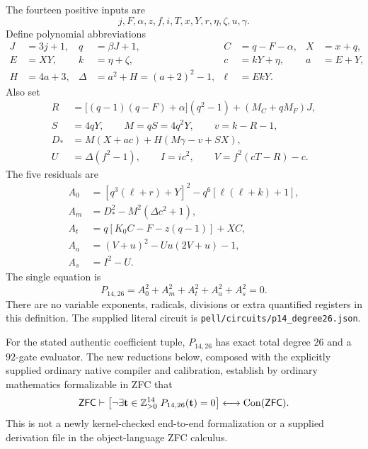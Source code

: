 The fourteen positive inputs are
\[
 j,F,\alpha,z,f,i,T,x,Y,r,\eta,\zeta,u,\gamma.
\]
Define polynomial abbreviations
\begin{align*}
 J&=3j+1,& q&=\beta J+1,& C&=q-F-\alpha,&X&=x+q,\\
 E&=XY,& k&=\eta+\zeta,&c&=kY+\eta,& a&=E+Y,\\
 H&=4a+3,&\Delta&=a^2+H=(a+2)^2-1,&\ell&=EkY.
\end{align*}
Also set
\begin{align*}
 R&=\bigl[(q-1)(q-F)+\alpha\bigr](q^2-1)
                      +(M_C+qM_F)J,\\
 S&=4qY,\qquad M=qS=4q^2Y,\qquad v=k-R-1,\\
 D_*&=M(X+ac)+H(M\gamma-v+SX),\\
 U&=\Delta(f^2-1),\qquad I=ic^2,\qquad V=f^2(cT-R)-c.
\end{align*}
The five residuals are
\begin{align}
 A_0&=[q^3(\ell+r)+Y]^2-q^6[\ell(\ell+k)+1],
                                                    \label{eq:pell-first}\\
 A_m&=D_*^2-M^2(\Delta c^2+1),                       \label{eq:pell-main}\\
 A_t&=q[K_0C-F-z(q-1)]+XC,                          \label{eq:pell-transport}\\
 A_a&=(V+u)^2-Uu(2V+u)-1,                           \label{eq:pell-aux}\\
 A_s&=I^2-U.                                       \label{eq:pell-strong}
\end{align}
The single equation is
\begin{equation}
 \boxed{P_{14,26}=A_0^2+A_m^2+A_t^2+A_a^2+A_s^2=0.}
 \label{eq:pell26}
\end{equation}
There are no variable exponents, radicals, divisions or extra quantified
registers in this definition. The supplied literal circuit is
\texttt{pell/circuits/p14\_degree26.json}.

\begin{theorem}
\label{thm:pell26}
For the stated authentic coefficient tuple, $P_{14,26}$ has exact total
degree $26$ and a $92$-gate evaluator. The new reductions below, composed
with the explicitly supplied ordinary native compiler and calibration,
establish by ordinary mathematics formalizable in ZFC that
\[
 \mathsf{ZFC}\vdash
 \bigl[\neg\exists\mathbf t\in\mathbb Z_{>0}^{14}\;
                   P_{14,26}(\mathbf t)=0\bigr]
       \longleftrightarrow\operatorname{Con}(\mathsf{ZFC}).
\]
This is not a newly kernel-checked end-to-end formalization or a supplied
derivation file in the object-language ZFC calculus.
\end{theorem}

